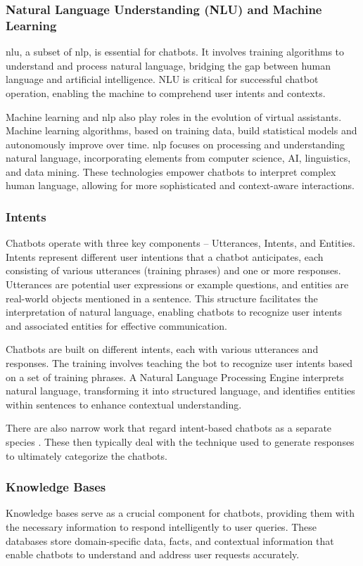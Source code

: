 \subsubsection{Natural Language Understanding (NLU) and Machine Learning}
\gls{nlu}, a subset of \gls{nlp}, is essential for chatbots.
It involves training algorithms to understand and process natural language, bridging the gap between human language and artificial intelligence. 
NLU is critical for successful chatbot operation, enabling the machine to comprehend user intents and contexts.

Machine learning and \gls{nlp} also play roles in the evolution of virtual assistants. 
Machine learning algorithms, based on training data, build statistical models and autonomously improve over time.
\gls{nlp} focuses on processing and understanding natural language, incorporating elements from computer science, AI, linguistics, and data mining. 
These technologies empower chatbots to interpret complex human language, allowing for more sophisticated and context-aware interactions.

\subsubsection{Intents}
Chatbots operate with three key components – Utterances, Intents, and Entities. Intents represent different user intentions that a chatbot anticipates, each consisting of various utterances (training phrases) and one or more responses. Utterances are potential user expressions or example questions, and entities are real-world objects mentioned in a sentence. This structure facilitates the interpretation of natural language, enabling chatbots to recognize user intents and associated entities for effective communication.

Chatbots are built on different intents, each with various utterances and responses. 
The training involves teaching the bot to recognize user intents based on a set of training phrases. 
A Natural Language Processing Engine interprets natural language, transforming it into structured language, and identifies entities within sentences to enhance contextual understanding.

There are also narrow work that regard intent-based chatbots as a separate species \cite{luo_critical_2022}. 
These then typically deal with the technique used to generate responses to ultimately categorize the chatbots.

\subsubsection{Knowledge Bases}
Knowledge bases serve as a crucial component for chatbots, providing them with the necessary information to respond intelligently to user queries. 
These databases store domain-specific data, facts, and contextual information that enable chatbots to understand and address user requests accurately.


